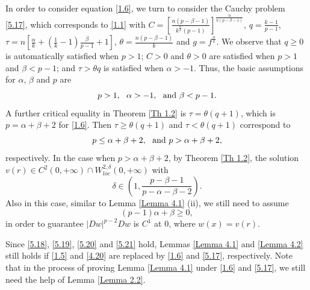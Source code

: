 \documentclass[a4paper,11pt]{amsart}
\theoremstyle{plain}
\theoremstyle{remark}
\numberwithin{equation}{section}
\numberwithin{figure}{section}
\numberwithin{remark}{section}
\begin{document}
\begin{sloppypar}
In order to consider equation \eqref{1.6}, we turn to consider the Cauchy problem \eqref{5.17}, which corresponds to \eqref{1.1} with $C=\left [\frac{n(p-\beta-1)}{k^{\frac{n}{k}}(p-1)} \right ]^{\frac{n}{k(p-\beta-1)}}$, $q=\frac{k-1}{p-1}$, $\tau =n\left[\frac{\alpha}{k}+(\frac{1}{k}-1)\frac{\beta}{p-1} +1\right]$, $\theta=\frac{n(p-\beta-1)}{k}$ and $g=f^{\frac{n}{k}}$. We observe that $q\ge 0$ is automatically satisfied when $p>1$; $C>0$ and $\theta>0$ are satisfied when $p>1$ and $\beta < p-1$; and $\tau > \theta q$ is satisfied when $\alpha >-1$. Thus, the basic assumptions for $\alpha$, $\beta$ and $p$ are 
\begin{equation}\label{5.18}
p>1, \ \ \alpha >-1,\ \ {\rm and} \ \beta < p-1.
\end{equation}
A further critical equality in Theorem \ref{Th 1.2} is $\tau=\theta (q+1)$, which is $p=\alpha + \beta +2$ for \eqref{1.6}. Then $\tau \ge \theta (q+1)$ and $\tau<\theta (q+1)$ correspond to 
\begin{equation}\label{5.19}
p \le \alpha +\beta +2, \ \ {\rm and} \ p> \alpha + \beta +2,
\end{equation}
respectively. In the case when $p> \alpha + \beta +2$, by Theorem \ref{Th 1.2}, the solution $v(r) \in C^2(0, +\infty) \cap W_{loc}^{2, \delta}(0, +\infty)$ with 
\begin{equation}\label{5.20}
\delta \in (1, \frac{p-\beta -1}{p-\alpha-\beta -2}).
\end{equation}
Also in this case, similar to Lemma \ref{Lemma 4.1} (ii), we still need to assume
\begin{equation}\label{5.21}
(p-1)\alpha + \beta \ge 0,
\end{equation}
in order to guarantee $|Dw|^{p-2}Dw$ is $C^1$ at $0$, where $w(x)=v(r)$.

Since \eqref{5.18}, \eqref{5.19}, \eqref{5.20} and \eqref{5.21} hold, Lemmas \ref{Lemma 4.1} and \ref{Lemma 4.2} still holds if \eqref{1.5} and \eqref{4.20} are replaced by \eqref{1.6} and \eqref{5.17}, respectively. Note that in the process of proving Lemma \ref{Lemma 4.1} under \eqref{1.6} and \eqref{5.17}, we still need the help of Lemma \ref{Lemma 2.2}.


\end{sloppypar}
\end{document}
